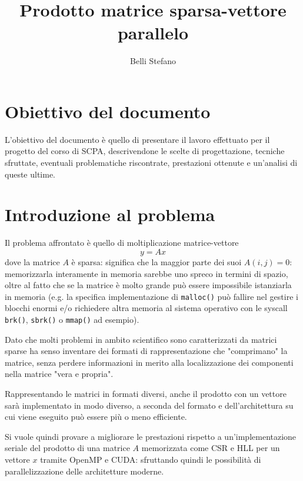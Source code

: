 \documentclass[9pt]{extarticle}
\title{Prodotto matrice sparsa-vettore parallelo}
\author{Belli Stefano}
\date{}
\begin{document}
\maketitle
\thispagestyle{empty}
\newpage

\pagestyle{empty}
\tableofcontents
\newpage

\section*{Obiettivo del documento}
L'obiettivo del documento è quello di presentare il lavoro effettuato per il progetto del
corso di SCPA, descrivendone le scelte di progettazione, tecniche sfruttate, 
eventuali problematiche riscontrate, prestazioni ottenute e un'analisi di queste ultime.

\newpage

\pagestyle{plain}

\section{Introduzione al problema}
Il problema affrontato è quello di moltiplicazione matrice-vettore
\begin{equation*}
y = Ax
\end{equation*}
dove la matrice $A$ è sparsa: significa che la maggior parte dei suoi $A(i,j) = 0$: memorizzarla
interamente in memoria sarebbe uno spreco in termini di spazio,
oltre al fatto che se la matrice è molto grande può
essere impossibile istanziarla in memoria (e.g. 
la specifica implementazione di \texttt{malloc()} può fallire nel gestire i blocchi enormi
e/o richiedere altra memoria al sistema operativo con le syscall
\texttt{brk()}, \texttt{sbrk()} o \texttt{mmap()} ad esempio).

Dato che molti problemi in ambito scientifico sono caratterizzati da matrici sparse ha senso inventare
dei formati di rappresentazione che "comprimano" la matrice, senza perdere informazioni in merito alla
localizzazione dei componenti nella matrice "vera e propria".

Rappresentando le matrici in formati diversi, anche il prodotto con un vettore sarà implementato in modo
diverso, a seconda del formato e dell'architettura su cui viene eseguito può essere più o meno efficiente.

Si vuole quindi provare a migliorare le prestazioni rispetto a un'implementazione seriale del prodotto di
una matrice $A$ memorizzata come CSR e HLL per un vettore $x$ tramite OpenMP e CUDA: sfruttando quindi le
possibilità di parallelizzazione delle architetture moderne.
\end{document}

